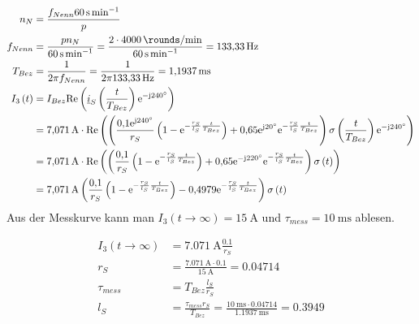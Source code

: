 \documentclass[11pt,a4paper]{scrartcl}
\newcommand{\mybr}[1]{\left(#1\right)}
\renewcommand{\j}{\mathrm{j}}
\renewcommand{\i}{\underline{i}}
\newcommand{\0}{_{\mybr{0}}}
\newcommand{\1}{_{\mybr{1}}}
\newcommand{\2}{_{\mybr{2}}}
\renewcommand{\e}{\mathrm{e}}
\renewcommand{\Re}{\mathrm{Re}}
\begin{document}
\section{}
\begin{align}
n_N&=\frac{f_{Nenn}\SI{60}{\second\per\minute}}{p}\\
f_{Nenn}&=\frac{p n_N}{\SI{60}{\second\per\minute}}=\frac{2\cdot\SI{4000}{\rounds\per\minute}}{\SI{60}{\second\per\minute}}=\SI{133.33}{\hertz}\\
T_{Bez}&=\frac{1}{2\pi f_{Nenn}}=\frac{1}{2\pi\SI{133.33}{\hertz}}=\SI{1.1937}{\milli\second}\\
I_3\mybr{t}&=I_{Bez}\Re\mybr{\i_S\mybr{\frac{t}{T_{Bez}}}\e^{-\j\SI{240}{\degree}}}\\
&=\SI{7.071}{\ampere}\cdot\Re\mybr{\mybr{\frac{\num{0.1}\e^{\j\SI{240}{\degree}}}{r_S}\mybr{1-\e^{-\frac{r_S}{l_S}\frac{t}{T_{Bez}}}}+\num{0.65}\e^{\j\SI{20}{\degree}}\e^{-\frac{r_S}{l_S}\frac{t}{T_{Bez}}}}\sigma\mybr{\frac{t}{T_{Bez}}}\e^{-\j\SI{240}{\degree}}}\\
&=\SI{7.071}{\ampere}\cdot\Re\mybr{\mybr{\frac{\num{0.1}}{r_S}\mybr{1-\e^{-\frac{r_S}{l_S}\frac{t}{T_{Bez}}}}+\num{0.65}\e^{-\j\SI{220}{\degree}}\e^{-\frac{r_S}{l_S}\frac{t}{T_{Bez}}}}\sigma\mybr{t}}\\
&=\SI{7.071}{\ampere}\mybr{\frac{\num{0.1}}{r_S}\mybr{1-\e^{-\frac{r_S}{l_S}\frac{t}{T_{Bez}}}}-\num{0.4979}\e^{-\frac{r_S}{l_S}\frac{t}{T_{Bez}}}}\sigma\mybr{t}\\
\end{align}
Aus der Messkurve kann man $I_3\mybr{t\rightarrow\infty}=\SI{15}{\ampere}$ und $\tau_{mess}=\SI{10}{\milli\second}$ ablesen.
\begin{figure*}[htbp]
	\centering
\end{figure*}
\begin{align}
I_3\mybr{t\rightarrow\infty}&=\SI{7.071}{\ampere}\frac{\num{0.1}}{r_S}\\
r_S&=\frac{\SI{7.071}{\ampere}\cdot\num{0.1}}{\SI{15}{\ampere}}=\num{0.04714}\\
\tau_{mess}&=T_{Bez}\frac{l_S}{r_S}\\
l_S&=\frac{\tau_{mess}r_S}{T_{Bez}}=\frac{\SI{10}{\milli\second}\cdot\num{0.04714}}{\SI{1.1937}{\milli\second}}=\num{0.3949}
\end{align}
\end{document}
